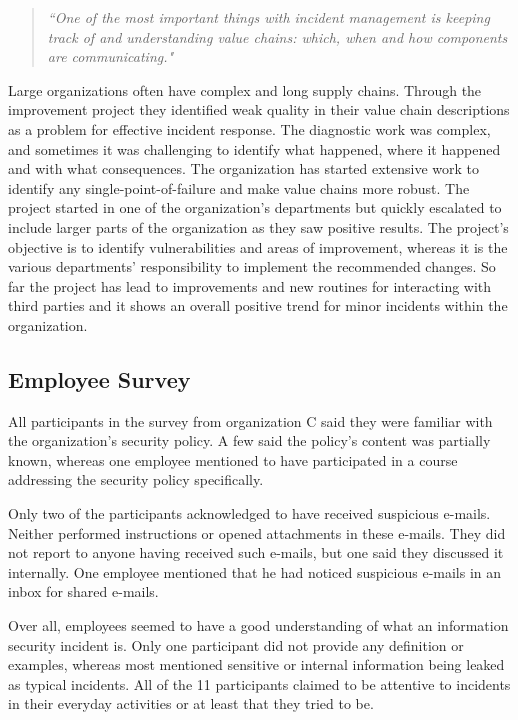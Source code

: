 \begin{quote}
\textit{``One of the most important things with incident management is keeping track of and understanding value chains: which, when and how components are communicating."}
\end{quote}

Large organizations often have complex and long supply chains. Through the improvement project they identified weak quality in their value chain descriptions as a problem for effective incident response. The diagnostic work was complex, and sometimes it was challenging to identify what happened, where it happened and with what consequences. The organization has started extensive work to identify any single-point-of-failure and make value chains more robust. The project started in one of the organization's departments but quickly escalated to include larger parts of the organization as they saw positive results. The project's objective is to identify vulnerabilities and areas of improvement, whereas it is the various departments' responsibility to implement the recommended changes. So far the project has lead to improvements and new routines for interacting with third parties and it shows an overall positive trend for minor incidents within the organization. 

\subsection{Employee Survey}
All participants in the survey from organization C said they were familiar with the organization's security policy. A few said the policy's content was partially known, whereas one employee mentioned to have participated in a course addressing the security policy specifically.

Only two of the participants acknowledged to have received suspicious e-mails. Neither performed instructions or opened attachments in these e-mails. They did not report to anyone having received such e-mails, but one said they discussed it internally. One employee mentioned that he had noticed suspicious e-mails in an inbox for shared e-mails. 

Over all, employees seemed to have a good understanding of what an information security incident is. Only one participant did not provide any definition or examples, whereas most mentioned sensitive or internal information being leaked as typical incidents. All of the 11 participants claimed to be attentive to incidents in their everyday activities or at least that they tried to be.

